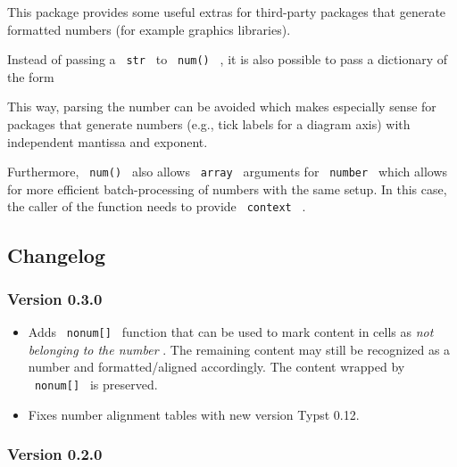 This package provides some useful extras for third-party packages that
generate formatted numbers (for example graphics libraries).

Instead of passing a \texttt{\ str\ } to \texttt{\ num()\ } , it is also
possible to pass a dictionary of the form

\begin{Shaded}
\begin{Highlighting}[]
\NormalTok{(}
\NormalTok{)}
\end{Highlighting}
\end{Shaded}

This way, parsing the number can be avoided which makes especially sense
for packages that generate numbers (e.g., tick labels for a diagram
axis) with independent mantissa and exponent.

Furthermore, \texttt{\ num()\ } also allows \texttt{\ array\ } arguments
for \texttt{\ number\ } which allows for more efficient batch-processing
of numbers with the same setup. In this case, the caller of the function
needs to provide \texttt{\ context\ } .

\subsection{Changelog}\label{changelog}

\subsubsection{Version 0.3.0}\label{version-0.3.0}

\begin{itemize}
\tightlist
\item
  Adds \texttt{\ nonum{[}{]}\ } function that can be used to mark
  content in cells as \emph{not belonging to the number} . The remaining
  content may still be recognized as a number and formatted/aligned
  accordingly. The content wrapped by \texttt{\ nonum{[}{]}\ } is
  preserved.
\item
  Fixes number alignment tables with new version Typst 0.12.
\end{itemize}

\subsubsection{Version 0.2.0}\label{version-0.2.0}

